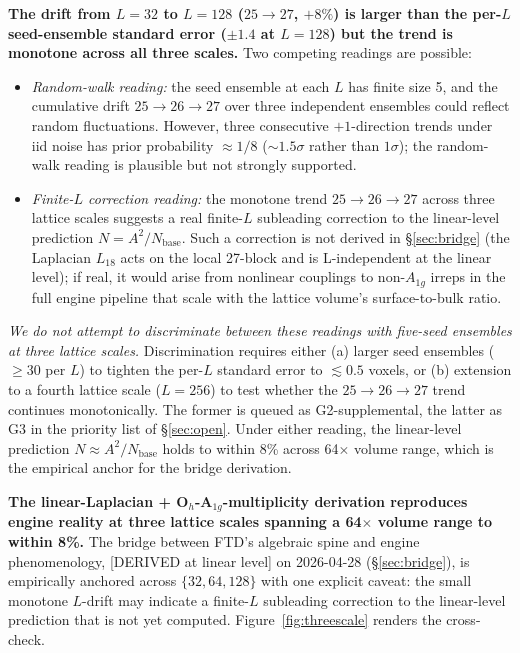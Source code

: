 \documentclass[11pt,reqno]{amsart}
\theoremstyle{plain}
\theoremstyle{definition}
\theoremstyle{remark}
\numberwithin{equation}{section}
\newcommand{\Aoneg}{A_{1g}}
\newcommand{\Nbase}{N_{\mathrm{base}}}
\begin{document}
\textbf{The drift from $L=32$ to $L=128$ ($25 \to 27$, $+8\%$) is
larger than the per-$L$ seed-ensemble standard error ($\pm 1.4$ at
$L=128$) but the trend is monotone across all three scales.} Two
competing readings are possible:

\begin{itemize}
\item \emph{Random-walk reading:} the seed ensemble at each $L$ has
finite size 5, and the cumulative drift $25\to 26\to 27$ over three
independent ensembles could reflect random fluctuations. However,
three consecutive $+1$-direction trends under iid noise has prior
probability $\approx 1/8$ ($\sim 1.5\sigma$ rather than $1\sigma$);
the random-walk reading is plausible but not strongly supported.
\item \emph{Finite-$L$ correction reading:} the monotone trend
$25 \to 26 \to 27$ across three lattice scales suggests a real
finite-$L$ subleading correction to the linear-level prediction
$N = A^{2}/\Nbase$. Such a correction is not derived in
\S\ref{sec:bridge} (the Laplacian $L_{18}$ acts on the local 27-block
and is L-independent at the linear level); if real, it would arise
from nonlinear couplings to non-$\Aoneg$ irreps in the full engine
pipeline that scale with the lattice volume's surface-to-bulk ratio.
\end{itemize}

\emph{We do not attempt to discriminate between these readings with
five-seed ensembles at three lattice scales.} Discrimination requires
either (a) larger seed ensembles ($\geq 30$ per $L$) to tighten the
per-$L$ standard error to $\lesssim 0.5$ voxels, or (b) extension to a
fourth lattice scale ($L = 256$) to test whether the $25 \to 26 \to 27$
trend continues monotonically. The former is queued as G2-supplemental,
the latter as G3 in the priority list of \S\ref{sec:open}. Under either
reading, the linear-level prediction $N \approx A^{2}/\Nbase$ holds to
within 8\% across 64$\times$ volume range, which is the empirical anchor
for the bridge derivation.

\textbf{The linear-Laplacian + O$_h$-A$_{1g}$-multiplicity derivation
reproduces engine reality at three lattice scales spanning a 64$\times$
volume range to within 8\%.} The bridge between FTD's algebraic spine
and engine phenomenology, [DERIVED at linear level] on 2026-04-28
(\S\ref{sec:bridge}), is empirically anchored across $\{32, 64, 128\}$
with one explicit caveat: the small monotone $L$-drift may indicate
a finite-$L$ subleading correction to the linear-level prediction
that is not yet computed. Figure~\ref{fig:threescale} renders the
cross-check.
\end{document}
